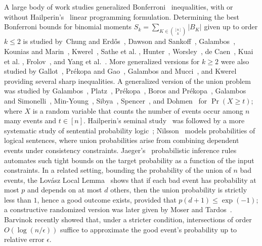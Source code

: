 \documentclass[11pt]{article}
\begin{document}
A large body of work studies generalized Bonferroni~\cite{Bonferroni1936} inequalities, with or without Hailperin's~\cite{Hailperin1965} linear programming formulation. Determining the best Bonferroni bounds for binomial moments $S_k=\sum_{K\in\binom{[n]}{k}}|B_K|$ given up to order $k \leq 2$ is studied by~Chung and Erdős~\cite{chungErdos1952}, Dawson and Sankoff~\cite{dawsonSankoff1967inequality}, Galambos~\cite{Galambos1977}, Kounias and Marin~\cite{ Kounias1968, KouniasMarin1976},  Kwerel~\cite{Kwerel1975}, Sathe et al. \cite{SathepPradhanShah1980}, Hunter~\cite{Hunter1976}, Worsley~\cite{Worsley1982}, de Caen~\cite{Caen1997lower}, Kuai et al. \cite{kuai2000lower, Kuai2000}, Frolov~\cite{frolov2012bounds},  and Yang et al.~\cite{YangAlajajiT2014}. More generalized versions for $k \geq 2$ were also studied by Gallot~\cite{gallot1966bound}, Prékopa and Gao~\cite{prekopa2005bounding}, Galambos and Mucci~\cite{galambos1Mucci980}, and Kwerel~\cite{Kwerel1975} providing several sharp inequalities. A generalized version of the union problem was studied by Galambos~\cite{Galambos1977}, Platz~\cite{platz1985sharp}, Prékopa~\cite{prekopa1988, prekopa1992inequalities}, Boros and Prékopa~\cite{BorosPrekopa1989}, Galambos and Simonelli~\cite{GalambosS1996}, Min-Young~\cite{MinYoung1991}, Sibya~\cite{Sibya1992}, Spencer~\cite{Spencer1994}, and Dohmen~\cite{Dohmen2003} for $\Pr(X \geq t)$; where $X$ is a random variable that counts the number of events occur among $n$ many events and $t \in [n]$. Hailperin's seminal study~\cite{Hailperin1965} was followed by a more systematic study of sentential probability logic~\cite{Hailperin1996}; Nilsson~\cite{nilsson1986} models probabilities of logical sentences, where union probabilities arise from combining dependent events under consistency constraints. Jaeger’s~\cite{jaeger2001} probabilistic inference rules automates such tight bounds on the target probability as a function of the input constraints.
In a related setting, bounding the probability of the union of $n$ bad events, the Lov\'{a}sz Local Lemma~\cite{lovaszErdos1973} shows that if each bad event has probability at most $p$ and depends on at most $d$ others, then the union probability is strictly less than $1$, hence a good outcome exists, provided that $p(d+1) \le \exp(-1)$; a constructive randomized version was later given by Moser and Tardos~\cite{tardosmoser2010}. Barvinok \cite{Barvinok2025} recently showed that, under a stricter condition, intersections of order $O(\log(n/\epsilon))$ suffice to approximate the good event's probability up to relative error $\epsilon$.
\end{document}
